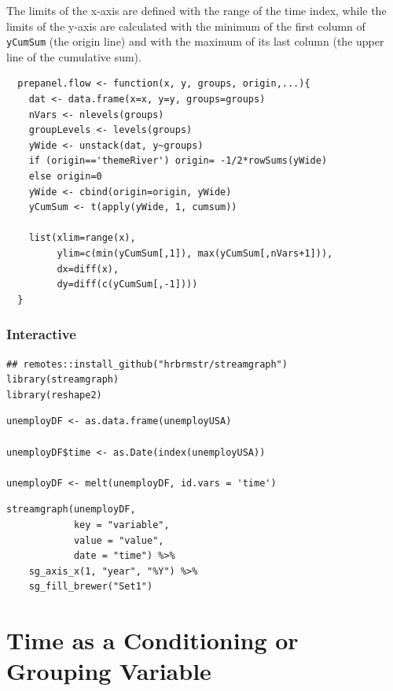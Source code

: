 \documentclass[smallroyalvopaper]{memoir}
\begin{document}
The limits of the x-axis are defined with the range of the time index,
while the limits of the y-axis are calculated with the minimum of the
first column of \texttt{yCumSum} (the origin line) and with the maximum of
its last column (the upper line of the cumulative sum).

\lstset{language=r,label= ,caption= ,captionpos=b,numbers=none}
\begin{lstlisting}
  prepanel.flow <- function(x, y, groups, origin,...){
    dat <- data.frame(x=x, y=y, groups=groups)
    nVars <- nlevels(groups)
    groupLevels <- levels(groups)
    yWide <- unstack(dat, y~groups)
    if (origin=='themeRiver') origin= -1/2*rowSums(yWide)
    else origin=0
    yWide <- cbind(origin=origin, yWide)
    yCumSum <- t(apply(yWide, 1, cumsum))
  
    list(xlim=range(x),
         ylim=c(min(yCumSum[,1]), max(yCumSum[,nVars+1])),
         dx=diff(x),
         dy=diff(c(yCumSum[,-1])))
  }
\end{lstlisting}

\subsection{Interactive \label{sec:interactive}}
\label{sec:orge90985f}

\lstset{language=r,label= ,caption= ,captionpos=b,numbers=none}
\begin{lstlisting}
## remotes::install_github("hrbrmstr/streamgraph")
library(streamgraph)
library(reshape2)
\end{lstlisting}

\lstset{language=r,label= ,caption= ,captionpos=b,numbers=none}
\begin{lstlisting}
unemployDF <- as.data.frame(unemployUSA)

unemployDF$time <- as.Date(index(unemployUSA))

unemployDF <- melt(unemployDF, id.vars = 'time')
\end{lstlisting}

\lstset{language=r,label= ,caption= ,captionpos=b,numbers=none}
\begin{lstlisting}
streamgraph(unemployDF,
            key = "variable",
            value = "value",
            date = "time") %>%
    sg_axis_x(1, "year", "%Y") %>%
    sg_fill_brewer("Set1")
\end{lstlisting}

\chapter{Time as a Conditioning or Grouping Variable}
\label{sec:org297158f}
\label{cha:timeGroupFactor}
\end{document}
